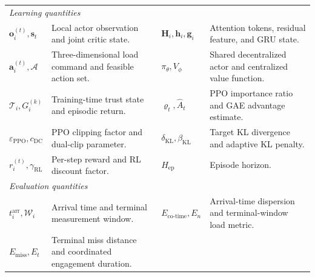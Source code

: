 \begin{table}[!t]
\begin{tabular}{@{}p{}p{}p{}p{}@{}}
\midrule
\multicolumn{4}{l}{\emph{Learning quantities}}\\
$\mathbf o_i^{(t)},\mathbf s_t$ & Local actor observation and joint critic state. &
$\mathbf H_i,\mathbf h_i,\mathbf g_i$ & Attention tokens, residual feature, and GRU state.\\
$\mathbf a_i^{(t)},\mathcal A$ & Three-dimensional load command and feasible action set. &
$\pi_\theta,V_\phi$ & Shared decentralized actor and centralized value function.\\
$\mathcal T_i,G_i^{(k)}$ & Training-time trust state and episodic return. &
$\varrho_t,\widehat A_t$ & PPO importance ratio and GAE advantage estimate.\\
$\varepsilon_{\mathrm{PPO}},c_{\mathrm{DC}}$ & PPO clipping factor and dual-clip parameter. &
$\delta_{\mathrm{KL}},\beta_{\mathrm{KL}}$ & Target KL divergence and adaptive KL penalty.\\
$r_i^{(t)},\gamma_{\mathrm{RL}}$ & Per-step reward and RL discount factor. &
$H_{\mathrm{ep}}$ & Episode horizon.\\
\midrule
\multicolumn{4}{l}{\emph{Evaluation quantities}}\\
$t_i^{\mathrm{arr}},\mathcal W_i$ & Arrival time and terminal measurement window. &
$E_{\mathrm{co\text{-}time}},E_n$ & Arrival-time dispersion and terminal-window load metric.\\
$E_{\mathrm{miss}},E_t$ & Terminal miss distance and coordinated engagement duration. & & \\
\bottomrule
\end{tabular}
\end{table}

